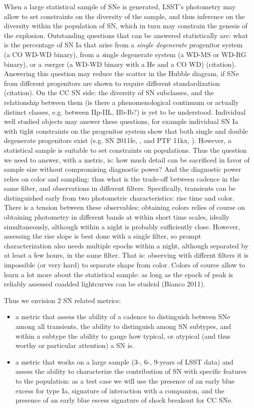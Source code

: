 When a large statistical sample of SNe is generated, LSST's photometry may allow to set constraints on the diversity of the sample, and thus inference on the diversity within the population of SN, which in turn may constrain the genesis of the explosion. Outstanding questions that can be answered statistically are: what is the percentage of SN Ia that arise from a \emph{single degenerate} progenitor system (a CO WD-WD binary), from a {\emph single degenerate} system (a WD-MS or WD-RG binary), or a {\emph merger} (a WD-WD binary with a He and a CO WD) (citation). Answering this question may reduce the scatter in the Hubble diagram, if SNe from different progenitors are shown to require different standardization (citation). On the CC SN side: the diversity of SN subclasses, and the relationship between them (is there a phenomenological continuum or actually distinct classes, e.g. between IIp-IIL, IIb-Ib?) is yet to be understood. Individual well studied objects may answer these questions, for example individual SN Ia with tight constraints on the progenitor system show that both single and double degenerate progenitors exist (e.g. SN 2011fe, \citealt{Li2011}, and PTF 11kx, \citealt{Dilday11}). However, a statistical sample is suitable to set constraints on populations. Thus the question  we need to answer, with a metric, is: how much detail can be sacrificed in favor of sample size without compromising diagnostic power? And the diagnostic power relies on color and sampling: thus what is the trade-off between cadence in the same filter, and observations in different filters. Specifically, transients can be distinguished early from two photometric characteristics: rise time and color. There is a tension between these observables: obtaining colors relies of course on obtaining photometry in different bands at within short time scales, ideally simultaneously, although within a night is probably sufficiently close. However, assessing the rise slope is best done with a single filter, so prompt characterization also needs multiple epochs within a night, although separated by at least a few hours, in the same filter. That is: observing with differnt filters it is impossible (or very hard) to separate shape from color. Colors of course allow to learn a lot more about the statistical sample: as long as the epoch of peak is reliably assessed coadded lightcurves can be studeid (Bianco 2011).


Thus we envision 2 SN related metrics: 
\begin{itemize}
\item a metric that assess the ability of a cadence to distinguish between SNe among all transients, the ability to distinguish among SN subtypes, and within a subtype the ability to gauge how typical, or atypical (and thus worthy or particular attention) a SN is. 
\item a metric that works on a large sample (3-, 6-, 9-years of LSST data) and assess the ability to characterize the contribution of SN with specific features to the population: as a test case we will use the presence of an early blue excess for type Ia, signature of interaction with a companion, and the presence of an early blue escess signature of shock breakout for CC SNe.
\end{itemize}
